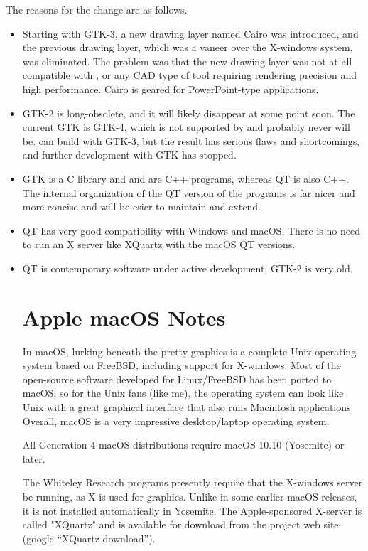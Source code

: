 The reasons for the change are as follows.
\begin{itemize}
\item{Starting with GTK-3, a new drawing layer named Cairo was
introduced, and the previous drawing layer, which was a vaneer over
the X-windows system, was eliminated.  The problem was that the new
drawing layer was not at all compatible with {\Xic}, or any
CAD type of tool requiring rendering precision and high performance.
Cairo is geared for PowerPoint-type applications.}
\item{GTK-2 is long-obsolete, and it will likely disappear at some
point soon.  The current GTK is GTK-4, which is not supported by
{\Xic} and probably never will be.  {\Xic} can build with
GTK-3, but the result has serious flaws and shortcomings, and
further development with GTK has stopped.}
\item{GTK is a C library and {\Xic} and {\WRspice} are C++
programs, whereas QT is also C++.  The internal organization of
the QT version of the programs is far nicer and more concise and
will be esier to maintain and extend.}
\item{QT has very good compatibility with Windows and macOS.  There
is no need to run an X server like XQuartz with the macOS QT
versions.}
\item{QT is contemporary software under active development, GTK-2
is very old.}

\section{Apple macOS Notes}

In macOS, lurking beneath the pretty graphics is a complete Unix
operating system based on FreeBSD, including support for X-windows. 
Most of the open-source software developed for Linux/FreeBSD has been
ported to macOS, so for the Unix fans (like me), the operating system
can look like Unix with a great graphical interface that also runs
Macintosh applications.  Overall, macOS is a very impressive
desktop/laptop operating system.

All Generation 4 macOS distributions require macOS 10.10 (Yosemite) or
later.

The Whiteley Research programs presently require that the X-windows
server be running, as X is used for graphics.  Unlike in some earlier
macOS releases, it is not installed automatically in Yosemite.  The
Apple-sponsored X-server is called "XQuartz" and is available for
download from the project web site (google ``XQuartz download'').


\end{itemize}

